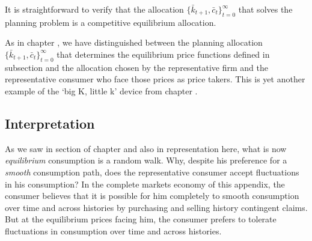 It is straightforward to verify that the allocation $\{\bar k_{t+1}, \bar c_t\}_{t=0}^\infty$ that solves the planning problem
is a competitive equilibrium allocation.

As in chapter ,
we have distinguished between the planning allocation $\{\bar k_{t+1}, \bar c_t\}_{t=0}^\infty$ that determines the equilibrium
price functions  defined in subsection  and the allocation chosen by the representative firm and the
representative consumer who face those prices as price takers. This is yet another example of the `big K, little k' device
from chapter   .



\subsection{Interpretation}

As we saw in section  of chapter  and also in
representation 
 here, what is now {\it equilibrium\/} consumption is a random walk.
Why, despite his preference for a {\it smooth\/} consumption path,  does the representative consumer accept
fluctuations in his consumption?   In the complete markets economy of this appendix, the consumer believes that it is possible for him
 completely to smooth consumption over time and across histories by purchasing and selling
history contingent claims. But at the equilibrium prices facing him, the consumer prefers to tolerate
 fluctuations in consumption over time and across histories.


\medskip

